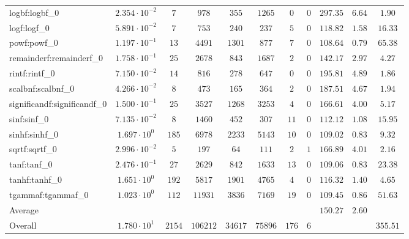 \begin{tabular}{|l|c|c|c|c|c|c|c|c|c|c|}
logbf:logbf\_0               & $ 2.354 \cdot 10^{-2} $ & $ 7      $ & $ 978    $ & $ 355   $ & $ 1265  $ & $ 0   $ & $ 0 $ & $ 297.35      $ & $ 6.64    $ & $ 1.90    $ \\
logf:logf\_0                 & $ 5.891 \cdot 10^{-2} $ & $ 7      $ & $ 753    $ & $ 240   $ & $ 237   $ & $ 5   $ & $ 0 $ & $ 118.82      $ & $ 1.58    $ & $ 16.33   $ \\
powf:powf\_0                 & $ 1.197 \cdot 10^{-1} $ & $ 13     $ & $ 4491   $ & $ 1301  $ & $ 877   $ & $ 7   $ & $ 0 $ & $ 108.64      $ & $ 0.79    $ & $ 65.38   $ \\
remainderf:remainderf\_0     & $ 1.758 \cdot 10^{-1} $ & $ 25     $ & $ 2678   $ & $ 843   $ & $ 1687  $ & $ 2   $ & $ 0 $ & $ 142.17      $ & $ 2.97    $ & $ 4.27    $ \\
rintf:rintf\_0               & $ 7.150 \cdot 10^{-2} $ & $ 14     $ & $ 816    $ & $ 278   $ & $ 647   $ & $ 0   $ & $ 0 $ & $ 195.81      $ & $ 4.89    $ & $ 1.86    $ \\
scalbnf:scalbnf\_0           & $ 4.266 \cdot 10^{-2} $ & $ 8      $ & $ 473    $ & $ 165   $ & $ 364   $ & $ 2   $ & $ 0 $ & $ 187.51      $ & $ 4.67    $ & $ 1.94    $ \\
significandf:significandf\_0 & $ 1.500 \cdot 10^{-1} $ & $ 25     $ & $ 3527   $ & $ 1268  $ & $ 3253  $ & $ 4   $ & $ 0 $ & $ 166.61      $ & $ 4.00    $ & $ 5.17    $ \\
sinf:sinf\_0                 & $ 7.135 \cdot 10^{-2} $ & $ 8      $ & $ 1460   $ & $ 452   $ & $ 307   $ & $ 11  $ & $ 0 $ & $ 112.12      $ & $ 1.08    $ & $ 15.95   $ \\
sinhf:sinhf\_0               & $ 1.697 \cdot 10^{0}  $ & $ 185    $ & $ 6978   $ & $ 2233  $ & $ 5143  $ & $ 10  $ & $ 0 $ & $ 109.02      $ & $ 0.83    $ & $ 9.32    $ \\
sqrtf:sqrtf\_0               & $ 2.996 \cdot 10^{-2} $ & $ 5      $ & $ 197    $ & $ 64    $ & $ 111   $ & $ 2   $ & $ 1 $ & $ 166.89      $ & $ 4.01    $ & $ 2.16    $ \\
tanf:tanf\_0                 & $ 2.476 \cdot 10^{-1} $ & $ 27     $ & $ 2629   $ & $ 842   $ & $ 1633  $ & $ 13  $ & $ 0 $ & $ 109.06      $ & $ 0.83    $ & $ 23.38   $ \\
tanhf:tanhf\_0               & $ 1.651 \cdot 10^{0}  $ & $ 192    $ & $ 5817   $ & $ 1901  $ & $ 4765  $ & $ 4   $ & $ 0 $ & $ 116.32      $ & $ 1.40    $ & $ 4.65    $ \\
tgammaf:tgammaf\_0           & $ 1.023 \cdot 10^{0}  $ & $ 112    $ & $ 11931  $ & $ 3836  $ & $ 7169  $ & $ 19  $ & $ 0 $ & $ 109.45      $ & $ 0.86    $ & $ 51.63   $ \\
\hline
Average                      & $                     $ & $        $ & $        $ & $       $ & $       $ & $     $ & $   $ & $ 150.27      $ & $ 2.60    $ & $         $ \\
\hline
Overall                      & $ 1.780 \cdot 10^{1}  $ & $ 2154   $ & $ 106212 $ & $ 34617 $ & $ 75896 $ & $ 176 $ & $ 6 $ & $             $ & $         $ & $ 355.51  $ \\
\hline
\end{tabular}
